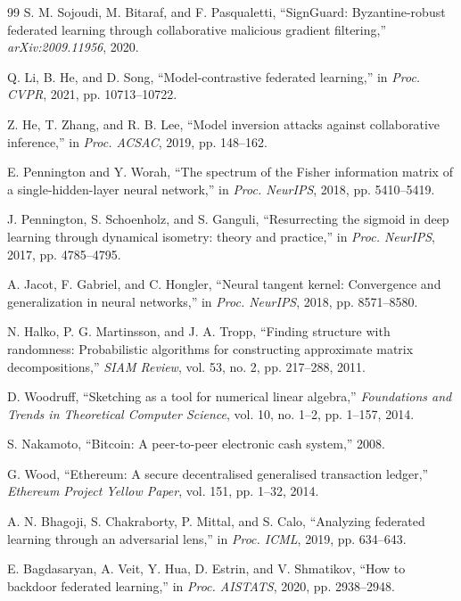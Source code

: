 \documentclass[runningheads]{llncs}
\begin{document}
\begin{thebibliography}{99}
 S. M. Sojoudi, M. Bitaraf, and F. Pasqualetti, ``SignGuard: Byzantine-robust federated learning through collaborative malicious gradient filtering,'' \textit{arXiv:2009.11956}, 2020.

 Q. Li, B. He, and D. Song, ``Model-contrastive federated learning,'' in \textit{Proc. CVPR}, 2021, pp. 10713--10722.

 Z. He, T. Zhang, and R. B. Lee, ``Model inversion attacks against collaborative inference,'' in \textit{Proc. ACSAC}, 2019, pp. 148--162.

 E. Pennington and Y. Worah, ``The spectrum of the Fisher information matrix of a single-hidden-layer neural network,'' in \textit{Proc. NeurIPS}, 2018, pp. 5410--5419.

 J. Pennington, S. Schoenholz, and S. Ganguli, ``Resurrecting the sigmoid in deep learning through dynamical isometry: theory and practice,'' in \textit{Proc. NeurIPS}, 2017, pp. 4785--4795.

 A. Jacot, F. Gabriel, and C. Hongler, ``Neural tangent kernel: Convergence and generalization in neural networks,'' in \textit{Proc. NeurIPS}, 2018, pp. 8571--8580.

 N. Halko, P. G. Martinsson, and J. A. Tropp, ``Finding structure with randomness: Probabilistic algorithms for constructing approximate matrix decompositions,'' \textit{SIAM Review}, vol. 53, no. 2, pp. 217--288, 2011.

 D. Woodruff, ``Sketching as a tool for numerical linear algebra,'' \textit{Foundations and Trends in Theoretical Computer Science}, vol. 10, no. 1--2, pp. 1--157, 2014.

 S. Nakamoto, ``Bitcoin: A peer-to-peer electronic cash system,'' 2008.

 G. Wood, ``Ethereum: A secure decentralised generalised transaction ledger,'' \textit{Ethereum Project Yellow Paper}, vol. 151, pp. 1--32, 2014.

 A. N. Bhagoji, S. Chakraborty, P. Mittal, and S. Calo, ``Analyzing federated learning through an adversarial lens,'' in \textit{Proc. ICML}, 2019, pp. 634--643.

 E. Bagdasaryan, A. Veit, Y. Hua, D. Estrin, and V. Shmatikov, ``How to backdoor federated learning,'' in \textit{Proc. AISTATS}, 2020, pp. 2938--2948.


\end{thebibliography}
\end{document}

